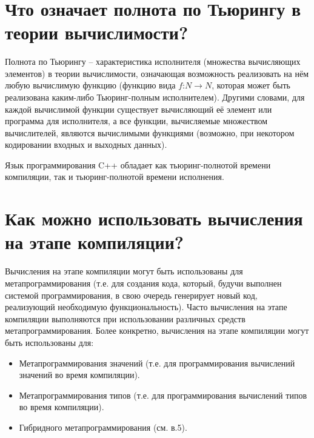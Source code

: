 \documentclass[a4paper,12pt]{article}	%
\title{
	\center{\textbf{Контрольные вопросы. Задание 12.}}
	}
\begin{document}

\maketitle

\section{Что означает полнота по Тьюрингу в теории вычислимости?}
	
	Полнота по Тьюрингу -- характеристика исполнителя (множества вычисляющих элементов) в теории вычислимости, означающая возможность реализовать на нём любую вычислимую функцию (функцию вида $f$:$N \rightarrow N$, которая может быть реализована каким-либо Тьюринг-полным исполнителем). Другими словами, для каждой вычислимой функции существует вычисляющий её элемент или программа для исполнителя, а все функции, вычисляемые множеством вычислителей, являются вычислимыми функциями (возможно, при некотором кодировании входных и выходных данных).
	
	Язык программирования C++ обладает как тьюринг-полнотой времени компиляции, так и тьюринг-полнотой времени исполнения.
		
\newpage

\section{Как можно использовать вычисления на этапе компиляции?}

	Вычисления на этапе компиляции могут быть использованы для метапрограммирования (т.е. для создания кода, который, будучи выполнен системой программирования, в свою очередь генерирует новый код, реализующий необходимую функциональность). Часто вычисления на этапе компиляции выполняются при использовании различных средств метапрограммирования. Более конкретно, вычисления на этапе компиляции могут быть использованы для:
	
	\begin{itemize}

		\item Метапрограммирования значений (т.е. для программирования вычислений значений во время компиляции).  	
		
		\item Метапрограммирования типов (т.е. для программирования вычислений типов во время компиляции).
		
		\item Гибридного метапрограммирования (см. в.5).
	
	\end{itemize}
			
\end{document}

